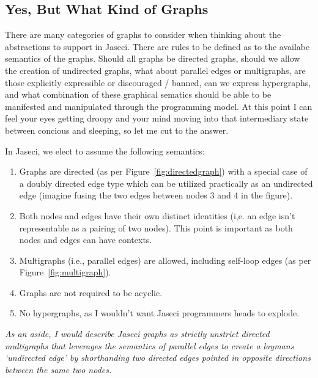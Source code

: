 \subsection{Yes, But What Kind of Graphs}

There are many categories of graphs to consider when thinking about the abstractions to support in Jaseci. There are rules to be defined as to the availabe semantics of the graphs. Should all graphs be \gls{directed graphs}, should we allow the creation of \gls{undirected graphs}, what about parallel edges or \gls{multigraphs}, are those explicitly expressible or discouraged / banned, can we express \gls{hypergraphs}, and what combination of these graphical sematics should be able to be manifested and manipulated through the programming model. At this point I can feel your eyes getting droopy and your mind moving into that intermediary state between concious and sleeping, so let me cut to the answer.
\par
\printfigGraphTypes
In Jaseci, we elect to assume the following semantics:
\begin{enumerate}
    \item Graphs are directed (as per Figure~\ref{fig:directedgraph}) with a special case of a doubly directed edge type which can be utilized practically as an undirected edge (imagine fusing the two edges between nodes 3 and 4 in the figure).
    \item Both nodes and edges have their own distinct identities (i,e. an edge isn't representable as a pairing of two nodes). This point is important as both nodes and edges can have \gls{contexts}.
    \item Multigraphs (i.e., parallel edges) are allowed, including self-loop edges (as per Figure~\ref{fig:multigraph}).
    \item Graphs are not required to be acyclic.
    \item No hypergraphs, as I wouldn't want Jaseci programmers heads to explode.

\end{enumerate}
\emph{As an aside, I would describe Jaseci graphs as strictly unstrict directed multigraphs that leverages the semantics of parallel edges to create a laymans `undirected edge' by shorthanding two directed edges pointed in opposite directions between the same two nodes.}
\par
